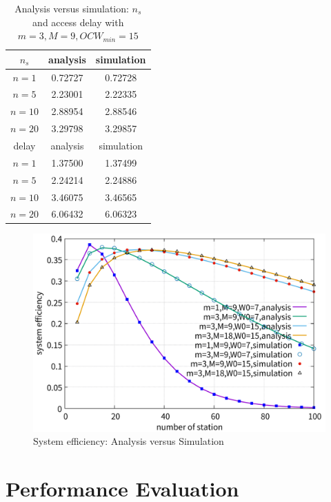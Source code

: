 \documentclass[journal]{IEEEtran}
\begin{document}
\begin{table}[!h]
\caption{Analysis versus simulation: $n_s$ and access delay with $m=3,M=9,OCW_{min} = 15$}
\label{table_val}
\begin{center}
\begin{tabular}{c|c|c}
\hline
$n_s$ 	& analysis 	& simulation \\
\hline
$n=1$ 	& 0.72727  	& 0.72728 \\
$n=5$ 	& 2.23001	& 2.22335 \\
$n=10$	& 2.88954	& 2.88546 \\
$n=20$	& 3.29798	& 3.29857 \\
\hline
delay	& analysis	& simulation \\
\hline
$n=1$ 	& 1.37500  	& 1.37499 \\
$n=5$ 	& 2.24214	& 2.24886 \\
$n=10$	& 3.46075	& 3.46565 \\
$n=20$	& 6.06432	& 6.06323 \\
\hline
\end{tabular}
\end{center}
\end{table}

%

\begin{figure}[!h]
\includegraphics[scale=0.36]{./figure/Section_model_validate/validate.pdf}
\caption{System efficiency: Analysis versus Simulation}
\label{validation}
\end{figure}

\section{Performance Evaluation} 	\label{sec_perf_eval}
\end{document}
